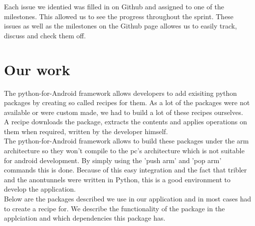 \documentclass{article}
\begin{document}
	Each issue we identied was filled in on Github and assigned to one of the milestones. This allowed us to see the progress throughout  the sprint. These issues as well as the milestones on the Github page allowes us to easily track, discuss and check them off. 

\section{Our work}
	The python-for-Android framework allows developers to add exisiting python packages by creating so called recipes for them. As a lot of the packages were not available or were custom made, we had to build a lot of these recipes ourselves.\\

	A recipe downloads the package, extracts the contents and applies operations on them when required, written by the developer himself.\\

	The python-for-Android framework allows to build these packages under the arm architecture so they won't compile to the pc's architecture which is not suitable for android development. By simply using the 'push arm' and 'pop arm' commands this is done. Because of this easy integration and the fact that tribler and the anontunnels were written in Python, this is a good environment to develop the application.\\

	Below are the packages described we use in our application and in most cases had to create a recipe for. We describe the functionality of the package in the applciation and which dependencies this package has.\\
\end{document}
